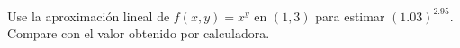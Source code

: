 Use la aproximación lineal de $f(x,y) = x^y$ en $(1, 3)$ para estimar $(1.03)^{2.95}$. Compare con el valor obtenido por calculadora.
